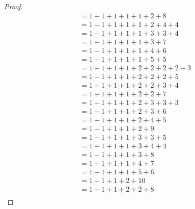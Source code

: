 \begin{proof}
\begin{align*}
           & = 1 + 1 + 1 + 1 + 1 + 2 + 8                                           \\
           & = 1 + 1 + 1 + 1 + 1 + 2 + 4 + 4                                       \\
           & = 1 + 1 + 1 + 1 + 1 + 3 + 3 + 4                                       \\
           & = 1 + 1 + 1 + 1 + 1 + 3 + 7                                           \\
           & = 1 + 1 + 1 + 1 + 1 + 4 + 6                                           \\
           & = 1 + 1 + 1 + 1 + 1 + 5 + 5                                           \\
           & = 1 + 1 + 1 + 1 + 2 + 2 + 2 + 2 + 3                                   \\
           & = 1 + 1 + 1 + 1 + 2 + 2 + 2 + 5                                       \\
           & = 1 + 1 + 1 + 1 + 2 + 2 + 3 + 4                                       \\
           & = 1 + 1 + 1 + 1 + 2 + 2 + 7                                           \\
           & = 1 + 1 + 1 + 1 + 2 + 3 + 3 + 3                                       \\
           & = 1 + 1 + 1 + 1 + 2 + 3 + 6                                           \\
           & = 1 + 1 + 1 + 1 + 2 + 4 + 5                                           \\
           & = 1 + 1 + 1 + 1 + 2 + 9                                               \\
           & = 1 + 1 + 1 + 1 + 3 + 3 + 5                                           \\
           & = 1 + 1 + 1 + 1 + 3 + 4 + 4                                           \\
           & = 1 + 1 + 1 + 1 + 3 + 8                                               \\
           & = 1 + 1 + 1 + 1 + 4 + 7                                               \\
           & = 1 + 1 + 1 + 1 + 5 + 6                                               \\
           & = 1 + 1 + 1 + 2 + 10                                                  \\
           & = 1 + 1 + 1 + 2 + 2 + 8                                               \\

\end{align*}
\end{proof}
